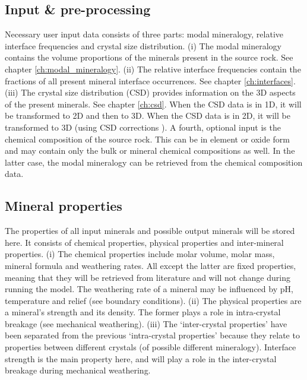    \subsection{Input \& pre-processing}
    Necessary user input data consists of three parts: modal mineralogy, relative interface frequencies and crystal size distribution. %
    (i) The modal mineralogy contains the volume proportions of the minerals present in the source rock. %
    See chapter \ref{ch:modal_mineralogy}. %
    (ii) The relative interface frequencies contain the fractions of all present mineral interface occurrences. %
    See chapter \ref{ch:interfaces}. %
    (iii) The crystal size distribution (CSD) provides information on the 3D aspects of the present minerals. %
    See chapter \ref{ch:csd}. %
    When the CSD data is in 1D, it will be transformed to 2D and then to 3D. %
    When the CSD data is in 2D, it will be transformed to 3D (using CSD corrections \cite{Higgins_2010}). %
    A fourth, optional input is the chemical composition of the source rock. %
    This can be in element or oxide form and may contain only the bulk or mineral chemical compositions as well. %
    In the latter case, the modal mineralogy can be retrieved from the chemical composition data. %

    \subsection{Mineral properties}
    The properties of all input minerals and possible output minerals will be stored here. %
    It consists of chemical properties, physical properties and inter-mineral properties. %
    (i) The chemical properties include molar volume, molar mass, mineral formula and weathering rates. %
    All except the latter are fixed properties, meaning that they will be retrieved from literature and will not change during running the model. %
    The weathering rate of a mineral may be influenced by pH, temperature and relief (see boundary conditions). %
    (ii) The physical properties are a mineral’s strength and its density. %
    The former plays a role in intra-crystal breakage (see mechanical weathering). %
    (iii) The ‘inter-crystal properties’ have been separated from the previous ‘intra-crystal properties’ because they relate to properties between different crystals (of possible different mineralogy). %
    Interface strength is the main property here, and will play a role in the inter-crystal breakage during mechanical weathering. %
    \linebreak

